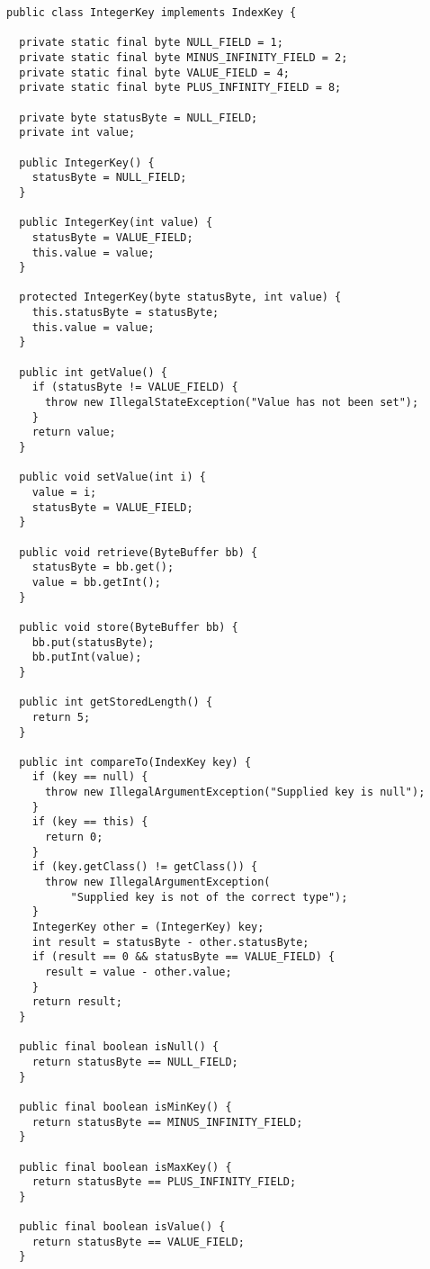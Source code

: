 \documentclass[a4paper,draft,oneside]{book}
\begin{document}
\begin{verbatim}
public class IntegerKey implements IndexKey {

  private static final byte NULL_FIELD = 1;
  private static final byte MINUS_INFINITY_FIELD = 2;
  private static final byte VALUE_FIELD = 4;
  private static final byte PLUS_INFINITY_FIELD = 8;

  private byte statusByte = NULL_FIELD;
  private int value;

  public IntegerKey() {
    statusByte = NULL_FIELD;
  }

  public IntegerKey(int value) {
    statusByte = VALUE_FIELD;
    this.value = value;
  }

  protected IntegerKey(byte statusByte, int value) {
    this.statusByte = statusByte;
    this.value = value;
  }

  public int getValue() {
    if (statusByte != VALUE_FIELD) {
      throw new IllegalStateException("Value has not been set");
    }
    return value;
  }

  public void setValue(int i) {
    value = i;
    statusByte = VALUE_FIELD;
  }

  public void retrieve(ByteBuffer bb) {
    statusByte = bb.get();
    value = bb.getInt();
  }

  public void store(ByteBuffer bb) {
    bb.put(statusByte);
    bb.putInt(value);
  }

  public int getStoredLength() {
    return 5;
  }

  public int compareTo(IndexKey key) {
    if (key == null) {
      throw new IllegalArgumentException("Supplied key is null");
    }
    if (key == this) {
      return 0;
    }
    if (key.getClass() != getClass()) {
      throw new IllegalArgumentException(
          "Supplied key is not of the correct type");
    }
    IntegerKey other = (IntegerKey) key;
    int result = statusByte - other.statusByte;
    if (result == 0 && statusByte == VALUE_FIELD) {
      result = value - other.value;
    }
    return result;
  }

  public final boolean isNull() {
    return statusByte == NULL_FIELD;
  }

  public final boolean isMinKey() {
    return statusByte == MINUS_INFINITY_FIELD;
  }

  public final boolean isMaxKey() {
    return statusByte == PLUS_INFINITY_FIELD;
  }

  public final boolean isValue() {
    return statusByte == VALUE_FIELD;
  }


\end{verbatim}
\end{document}
